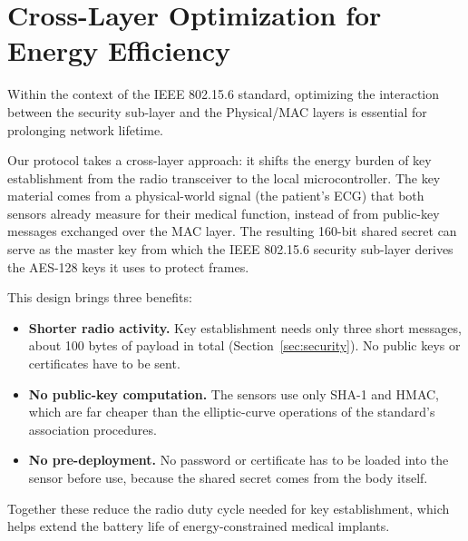 \section{Cross-Layer Optimization for Energy Efficiency}
Within the context of the IEEE 802.15.6 standard, optimizing the interaction between the security sub-layer and the Physical/MAC layers is essential for prolonging network lifetime.

Our protocol takes a cross-layer approach: it shifts the energy burden of key establishment from the radio transceiver to the local microcontroller. The key material comes from a physical-world signal (the patient's ECG) that both sensors already measure for their medical function, instead of from public-key messages exchanged over the MAC layer. The resulting 160-bit shared secret can serve as the master key from which the IEEE 802.15.6 security sub-layer derives the AES-128 keys it uses to protect frames.

This design brings three benefits:
\begin{itemize}
  \item \textbf{Shorter radio activity.} Key establishment needs only three short messages, about 100 bytes of payload in total (Section~\ref{sec:security}). No public keys or certificates have to be sent.
  \item \textbf{No public-key computation.} The sensors use only SHA-1 and HMAC, which are far cheaper than the elliptic-curve operations of the standard's association procedures.
  \item \textbf{No pre-deployment.} No password or certificate has to be loaded into the sensor before use, because the shared secret comes from the body itself.
\end{itemize}
Together these reduce the radio duty cycle needed for key establishment, which helps extend the battery life of energy-constrained medical implants.
